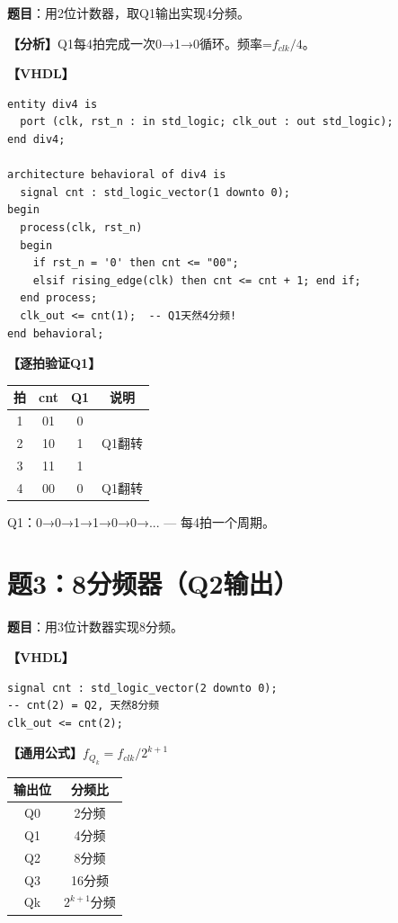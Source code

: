 \textbf{题目}：用2位计数器，取Q1输出实现4分频。

\begin{solution}[完整解答]

\textbf{【分析】}Q1每4拍完成一次0→1→0循环。频率=$f_{clk}/4$。

\textbf{【VHDL】}
\begin{lstlisting}
entity div4 is
  port (clk, rst_n : in std_logic; clk_out : out std_logic);
end div4;

architecture behavioral of div4 is
  signal cnt : std_logic_vector(1 downto 0);
begin
  process(clk, rst_n)
  begin
    if rst_n = '0' then cnt <= "00";
    elsif rising_edge(clk) then cnt <= cnt + 1; end if;
  end process;
  clk_out <= cnt(1);  -- Q1天然4分频!
end behavioral;
\end{lstlisting}

\textbf{【逐拍验证Q1】}
\begin{center}
\begin{tabular}{|c|c|c|c|}\hline
拍 & cnt & Q1 & 说明 \\ \hline
1 & 01 & 0 & \\ \hline 2 & 10 & 1 & Q1翻转 \\ \hline
3 & 11 & 1 & \\ \hline 4 & 00 & 0 & Q1翻转 \\ \hline
\end{tabular}
\end{center}
Q1：0→0→1→1→0→0→... — 每4拍一个周期。

\end{solution}


\section{题3：8分频器（Q2输出）}

\textbf{题目}：用3位计数器实现8分频。

\begin{solution}[完整解答]

\textbf{【VHDL】}
\begin{lstlisting}
signal cnt : std_logic_vector(2 downto 0);
-- cnt(2) = Q2, 天然8分频
clk_out <= cnt(2);
\end{lstlisting}

\textbf{【通用公式】}$f_{Q_k} = f_{clk} / 2^{k+1}$

\begin{center}
\begin{tabular}{|c|c|}\hline
输出位 & 分频比 \\ \hline
Q0 & 2分频 \\ \hline Q1 & 4分频 \\ \hline
Q2 & 8分频 \\ \hline Q3 & 16分频 \\ \hline
Qk & $2^{k+1}$分频 \\ \hline
\end{tabular}
\end{center}

\end{solution}


